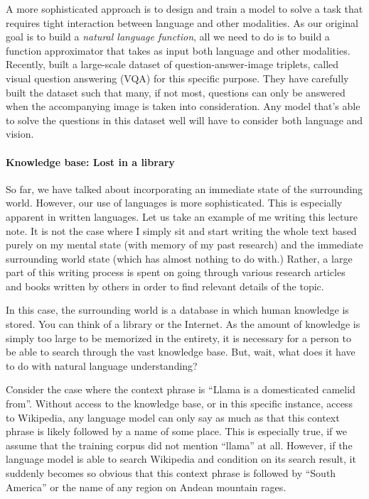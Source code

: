\documentclass{report}
\begin{document}
A more sophisticated approach is to design and train a model to solve a task
that requires tight interaction between language and other modalities. As our
original goal is to build a {\em natural language function}, all we need to do
is to build a function approximator that takes as input both language and other
modalities. Recently, \citet{VQA} built a large-scale dataset of
question-answer-image triplets, called visual question answering (VQA) for this
specific purpose. They have carefully built the dataset such that many, if not
most, questions can only be answered when the accompanying image is taken into
consideration. Any model that's able to solve the questions in this dataset well
will have to consider both language and vision.

\paragraph{Knowledge base: Lost in a library} 

So far, we have talked about incorporating an immediate state of the surrounding
world. However, our use of languages is more sophisticated. This is especially
apparent in written languages. Let us take an example of me writing this lecture
note. It is not the case where I simply sit and start writing the whole text
based purely on my mental state (with memory of my past research) and the
immediate surrounding world state (which has almost nothing to do with.) Rather,
a large part of this writing process is spent on going through various research
articles and books written by others in order to find relevant details of the
topic. 

In this case, the surrounding world is a database in which human knowledge is
stored. You can think of a library or the Internet. As the amount of knowledge
is simply too large to be memorized in the entirety, it is necessary for a
person to be able to search through the vast knowledge base. But, wait, what
does it have to do with natural language understanding?

Consider the case where the context phrase is ``Llama is a domesticated camelid
from''. Without access to the knowledge base, or in this specific instance,
access to Wikipedia, any language model can only say as much as that this
context phrase is likely followed by a name of some place. This is especially
true, if we assume that the training corpus did not mention ``llama'' at all.
However, if the language model is able to search Wikipedia and condition on its
search result, it suddenly becomes so obvious that this context phrase is
followed by ``South America'' or the name of any region on Andean mountain
rages. 
\end{document}
